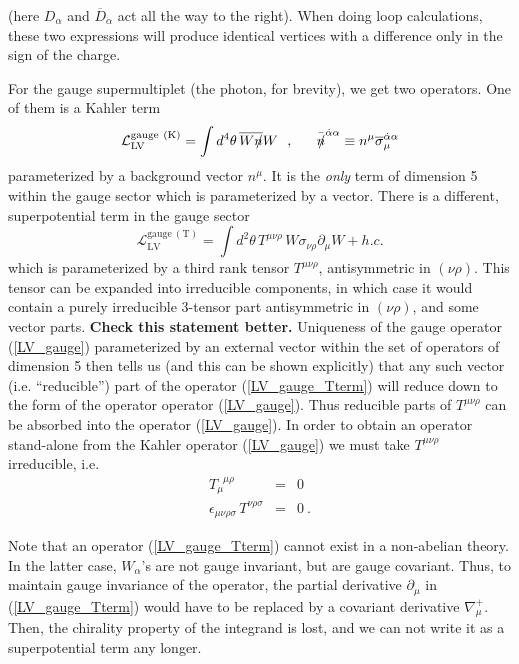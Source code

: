 \documentclass[a4paper,12pt]{article}
\newcommand{\slashed}[1]{\hbox{{$#1$}\llap{$/$}}}
\begin{document}
	(here $ D_\alpha $ and $ \overline{D}_{\dot{\alpha}} $
	act all the way to the right).
	When doing loop calculations, these two expressions will produce
	identical vertices with a difference only in the sign of the
	charge.

	For the gauge supermultiplet (the photon, for brevity), 
	we get two operators.
	One of them is a Kahler term
\begin{equation}
\label{LV_gauge}
	\mathcal{L}_{\mathrm{LV}}^{\mathrm{gauge\ (K)}} =
        \int d^4\theta \, \overline{W \slashed{n}}W    ~~,
         ~~~~~ \bar{\slashed{n}}^{\dot{\alpha}\alpha} \equiv
               n^\mu \overline{\sigma}_\mu^{\dot{\alpha}\alpha}
\end{equation}
	parameterized by a background vector $ n^\mu $.
	It is the {\it only} term of dimension 5 within the gauge
	sector which is parameterized by a vector. 
	There is a different, superpotential term in the gauge
	sector
\begin{equation}
\label{LV_gauge_Tterm}
	\mathcal{L}_{\mathrm{LV}}^{\mathrm{gauge\ (T)}} =
	\int d^2\theta \, T^{\mu\nu\rho} \,
	        W \sigma_{\nu\rho} \partial_\mu W  + h.c.
\end{equation}
	which is parameterized by a third rank tensor 
  $ T^{\mu\nu\rho} $,
	antisymmetric in $(\nu\rho)$.
        This tensor can be expanded into irreducible components,
	in which case it would contain a purely irreducible
	3-tensor part antisymmetric in
	$(\nu\rho)$, and some vector parts.
	{\bf Check this statement better.}
	Uniqueness of the gauge operator (\ref{LV_gauge}) parameterized
	by an external vector within the set of operators of dimension
	5 then tells us (and this can be shown
	explicitly) that any such vector (i.e. ``reducible'') part of 
	the operator (\ref{LV_gauge_Tterm}) will reduce down to
	the form of the operator operator (\ref{LV_gauge}).
	Thus reducible parts of $ T^{\mu\nu\rho} $ can be
	absorbed into the operator (\ref{LV_gauge}).
	In order to obtain an operator stand-alone from the Kahler
	operator (\ref{LV_gauge}) we must take
  $ T^{\mu\nu\rho} $
	irreducible, i.e.
\begin{eqnarray*}
	T_\mu^{\phantom{\mu}\mu\rho} & = & 0 \\
	\epsilon_{\mu\nu\rho\sigma}\, T^{\nu\rho\sigma} & = & 0~.
\end{eqnarray*}

	Note that an operator 
(\ref{LV_gauge_Tterm}) 
	cannot exist in a non-abelian theory. 
	In the latter case, $ W_\alpha $'s are not gauge invariant,
	but are gauge covariant.
	Thus, to maintain gauge invariance of the operator, the
	partial derivative $ \partial_\mu $ in 
	(\ref{LV_gauge_Tterm}) would have to be replaced by
	a covariant derivative $ \nabla_\mu^+ $. 
	Then, the chirality property of the integrand is lost,
	and we can not write it as a superpotential term any longer.
\end{document}
